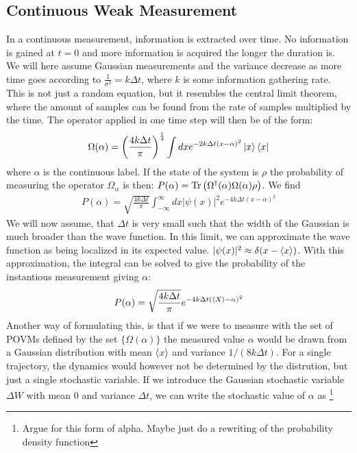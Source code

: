 \subsection{Continuous Weak Measurement}\label{sec:continuous_weak_measurement}
In a continuous measurement, information is extracted over time. No information is gained at $t=0$ and more information is acquired the longer the duration is. We will here assume Gaussian measurements and the variance decrease as more time goes according to $\frac{1}{\sigma^2} = k \Delta t$, where $k$ is some information gathering rate. This is not just a random equation, but it resembles the central limit theorem, where the amount of samples can be found from the rate of samples multiplied by the time. The operator applied in one time step will then be of the form:
\begin{equation}
    \Omega(\alpha) = \left(\frac{4 k \Delta t}{\pi}\right)^\frac14 \int dx e^{-2k\Delta t (x - \alpha)^2} \ket{x}\bra{x}
\end{equation}
where $\alpha$ is the continuous label. If the state of the system is $\rho$ the probability of measuring the operator $\Omega_\alpha$ is then: $P(\alpha) = \Tr\left(\Omega^\dagger(\alpha) \Omega(\alpha) \rho \right)$. We find %
\begin{align}
    P(\alpha) = \sqrt{\frac{4 k \Delta t}{\pi}} \int_{-\infty}^{\infty} dx |\psi(x)|^2 e^{-4k\Delta t (x - \alpha)^2}
\end{align}
We will now assume, that $\Delta t$ is very small such that the width of the Gaussian is much broader than the wave function. In this limit, we can approximate the wave function as being localized in its expected value. $|\psi(x)|^2 \approx \delta(x-\expval{x})$. With this approximation, the integral can be solved to give the probability of the instantious measurement giving $\alpha$:
\begin{equation}\label{eq:probability_of_alpha_gaussian}
    P(\alpha) = \sqrt{\frac{4 k \Delta t}{\pi}}  e^{-4k\Delta t (\expval{X} - \alpha)^2}
\end{equation}
Another way of formulating this, is that if we were to measure with the set of POVMs defined by the set $\{\Omega(\alpha)\}$ the measured value $\alpha$ would be drawn from a Gaussian distribution with mean $\expval{x}$ and variance $1 / (8k\Delta t)$. For a single trajectory, the dynamics would however not be determined by the distrution, but just a single stochastic variable. If we introduce the Gaussian stochastic variable $\Delta W$ with mean $0$ and variance $\Delta t$, we can write the stochastic value of $\alpha$ as \footnote{Argue for this form of alpha. Maybe just do a rewriting of the probability density function}
